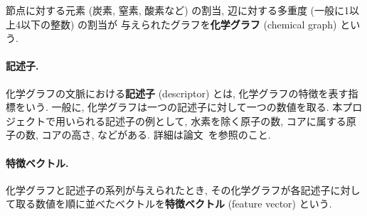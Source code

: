 \documentclass[11pt, titlepage, dvipdfmx, twoside]{jarticle}
\begin{document}
節点に対する元素 (炭素, 窒素, 酸素など) の割当, 
辺に対する多重度 (一般に1以上4以下の整数) の割当が
与えられたグラフを{\bf 化学グラフ} (chemical graph) という. 

\paragraph{記述子.}
化学グラフの文脈における{\bf 記述子} (descriptor) とは, 化学グラフの特徴を表す指標をいう.
一般に, 化学グラフは一つの記述子に対して一つの数値を取る.
本プロジェクトで用いられる記述子の例として,
水素を除く原子の数, コアに属する原子の数, コアの高さ, などがある. 
詳細は論文~\cite{BH_cyclic_arxiv}を参照のこと. 

\paragraph{特徴ベクトル.}
化学グラフと記述子の系列が与えられたとき,
その化学グラフが各記述子に対して取る数値を順に並べたベクトルを{\bf 特徴ベクトル} (feature vector)
という. 


\end{document}
